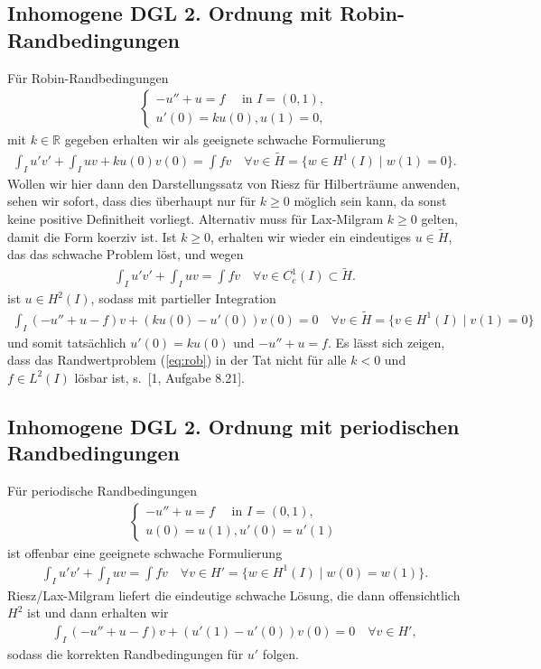 \documentclass[twoside]{article}
\theoremstyle{definition}
\begin{document}
\subsection{Inhomogene DGL 2. Ordnung mit Robin-Randbedingungen}
Für Robin-Randbedingungen
\begin{align}
\begin{cases}
-u'' + u = f \quad \text{ in } I = (0,1),\\
u'(0)=k u(0), u(1)=0,
\end{cases} \label{eq:rob}
\end{align}
mit $k \in \mathbb{R}$ gegeben erhalten wir als geeignete schwache Formulierung
\begin{align*}
\int_I u'v' + \int_I uv + k u(0) v(0) = \int fv \quad \forall v \in \tilde{H} = \{ w \in H^1(I) \; | \; w(1)=0 \}.
\end{align*}
Wollen wir hier dann den Darstellungssatz von Riesz für Hilberträume anwenden, sehen wir sofort, dass dies überhaupt nur für $k \geq 0$ möglich sein kann, da sonst keine positive Definitheit vorliegt. Alternativ muss für Lax-Milgram $k \geq 0$ gelten, damit die Form koerziv ist. Ist $k \geq 0$, erhalten wir wieder ein eindeutiges $u \in \tilde{H}$, das das schwache Problem löst, und wegen 
\begin{align*}
\int_I u'v' + \int_I uv = \int fv \quad \forall v \in C_c^1(I) \subset \tilde{H}.
\end{align*}
ist $u \in H^2(I)$, sodass mit partieller Integration
\begin{align*}
\int_I (-u'' + u - f)v + (k u(0)-u'(0)) v(0) = 0 \quad \forall v \in \tilde{H} = \{ v \in H^1(I) \; | \; v(1)=0 \}
\end{align*}
und somit tatsächlich $u'(0)=k u(0)$ und $-u'' + u = f$. Es lässt sich zeigen, dass das Randwertproblem (\ref{eq:rob}) in der Tat nicht für alle $k < 0$ und $f \in L^2(I)$ lösbar ist, s.\ [1, Aufgabe 8.21].
\subsection{Inhomogene DGL 2. Ordnung mit periodischen Randbedingungen}
Für periodische Randbedingungen
\begin{align}
\begin{cases}
-u'' + u = f \quad \text{ in } I = (0,1),\\
u(0)=u(1),u'(0)=u'(1)
\end{cases} \label{eq:per}
\end{align}
ist offenbar eine geeignete schwache Formulierung
\begin{align*}
\int_I u' v' + \int_I uv = \int fv \quad \forall v \in H' = \{w \in H^1(I) \; | \; w(0)=w(1)\}.
\end{align*}
Riesz/Lax-Milgram liefert die eindeutige schwache Lösung, die dann offensichtlich $H^2$ ist und dann erhalten wir
\begin{align*}
\int_I (-u''+u-f)v +(u'(1)-u'(0))v(0) = 0 \quad \forall v \in H',
\end{align*}
sodass die korrekten Randbedingungen für $u'$ folgen.
\end{document}
